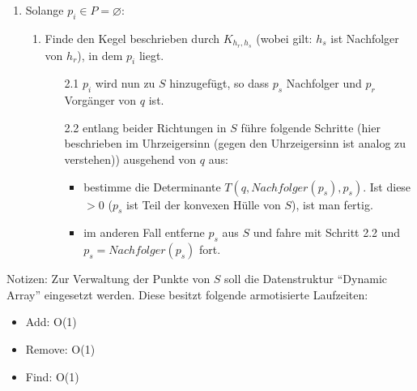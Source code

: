 \documentclass[a4paper]{article}
\begin{document}
\begin{enumerate}

\item Solange $p_i \in P = \varnothing$:

\begin{enumerate}

  \item Finde den Kegel beschrieben durch $K_{h_r,h_s}$ (wobei gilt: $h_s$ ist Nachfolger von $h_r$), in dem $p_i$ liegt.

  \begin{itemize}
	  \item[2.1] $p_i$ wird nun zu $S$ hinzugefügt, so dass $p_s$ Nachfolger und $p_r$ Vorgänger von $q$ ist.
	  
	  \item[2.2] entlang beider Richtungen in $S$ führe folgende Schritte (hier beschrieben im Uhrzeigersinn (gegen den Uhrzeigersinn ist analog zu verstehen)) ausgehend von $q$ aus:
	  
	  \begin{itemize}
		  \item bestimme die Determinante $T(q, Nachfolger(p_s), p_s)$. Ist diese $>0$ ($p_s$ ist Teil der konvexen Hülle von $S$), ist man fertig.
		  \item im anderen Fall entferne $p_s$ aus $S$ und fahre mit Schritt 2.2 und $p_s = Nachfolger(p_s)$ fort. 
	  \end{itemize}

  \end{itemize}
  
\end{enumerate}

\end{enumerate}

Notizen:
Zur Verwaltung der Punkte von $S$ soll die Datenstruktur "`Dynamic Array"'
eingesetzt werden. 
Diese besitzt folgende armotisierte Laufzeiten:
\begin{itemize}
 \item Add: O(1)
 \item Remove: O(1)
 \item Find: O(1)
\end{itemize}
\end{document}
